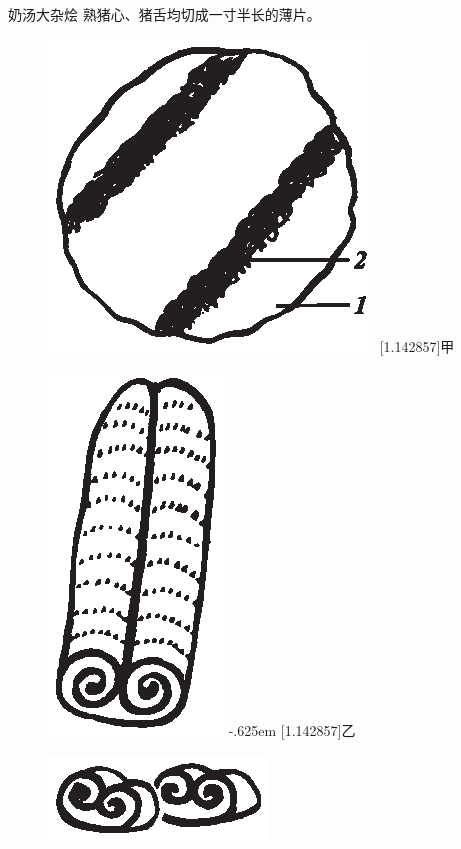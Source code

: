 \begin{recipe}{奶汤大杂烩}
\step 熟猪心、猪舌均切成一寸半长的薄片。

\begin{figure}[h]
\begin{center}%
\vspace{-.5\baselineskip}%
\quad\includegraphics[scale=1]{illustration-002a.eps}%
\baselineskip%
\hbox{\fsfamily\scalebox{1}[1.142857]{甲}}%
\vspace{.\baselineskip}%
\end{center}%
%
\parbox{14.75em}{%
	\hspace{4em}\includegraphics[scale=1]{illustration-002b.eps}%
	\kern-.625em\baselineskip%
	\hbox{\fsfamily\scalebox{1}[1.142857]{乙}}%
}%
\begin{minipage}{11em}
	\vspace{.25\baselineskip}%
	\includegraphics[scale=1]{illustration-002c.eps}%

\end{minipage}
\end{figure}
\end{recipe}
